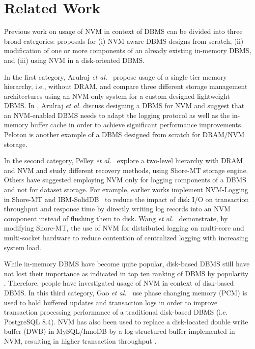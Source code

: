\section{Related Work}
\label{sec:RelatedWork}
Previous work on usage of NVM in context of DBMS
can be divided into three broad categories: proposals for (i)
NVM-aware DBMS designs from scratch, (ii) modification of
one or more components of an already existing in-memory
DBMS, and (iii) using NVM in a disk-oriented DBMS.

In the first category, Arulraj \textit{et al.}~\cite{arulraj2015let} propose usage of a single tier memory hierarchy, i.e., without DRAM, and compare three different storage management architectures using an NVM-only system for a custom designed lightweight DBMS. In \cite{arulraj2017build}, Arulraj \textit{et al.} discuss designing a DBMS for NVM and suggest that an NVM-enabled DBMS needs to adapt the logging protocol as well as the in-memory buffer cache in order to achieve significant performance improvements. Peloton \cite{PeletonLink} is another example of a DBMS designed from scratch for DRAM/NVM storage.

In the second category, Pelley \textit{et al.}~\cite{pelley2013storage} explore a two-level hierarchy with DRAM and NVM and study different recovery methods, using Shore-MT \cite{johnson2009shore} storage engine. Others have suggested employing NVM only for logging components of a DBMS and not for dataset storage. For example, earlier works implement NVM-Logging in Shore-MT and IBM-SolidDB~\cite{fang2011high,huang2014nvram} to reduce the impact of disk I/O on transaction throughput and response time by directly writing log records into an NVM component instead of flushing them to disk. Wang \textit{et al.}~\cite{wang2014scalable} demonstrate, by modifying Shore-MT, the use of NVM for distributed logging on multi-core and multi-socket hardware to reduce contention of centralized logging with increasing system load.

While in-memory DBMS have become quite popular, disk-based DBMS still have not lost their importance as indicated in  top ten ranking of DBMS by popularity \cite{RankingLink}. Therefore, people have investigated usage of NVM in context of disk-based DBMS. In this third category, Gao \textit{et al.}~\cite{gao2011pcmlogging} use phase changing memory (PCM) is used to hold buffered updates and transaction logs in order to improve transaction processing performance of a traditional disk-based DBMS (i.e. PostgreSQL 8.4). NVM has also been used to replace a disk-located double write buffer (DWB) in MySQL/InnoDB by a log-structured buffer implemented in NVM, resulting in higher transaction throughput \cite{son2017log}.


